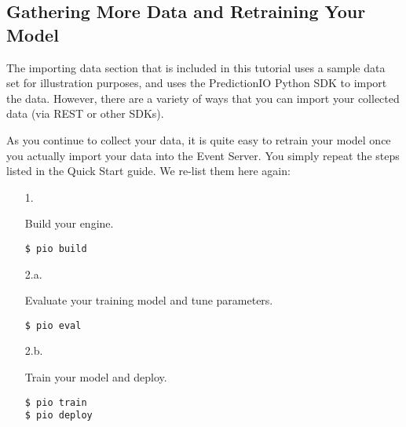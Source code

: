 \documentclass[a4paper,12pt]{article}
\newcommand{\3}{\left}
\newcommand{\4}{\right}
\renewcommand{\-}[1]{{}^{-#1}}
\begin{document}
\subsection*{Gathering More Data and Retraining Your Model}

The importing data section that is included in this tutorial uses a sample data set for illustration purposes, and uses the PredictionIO Python SDK to import the data. However, there are a variety of ways that you can import your collected data (via REST or other SDKs).

As you continue to collect your data, it is quite easy to retrain your model once you actually import your data into the Event Server. You simply repeat the steps listed in the Quick Start guide. We re-list them here again:

\begin{itemize}
\item[1.]{Build your engine.
\begin{verbatim}
$ pio build
\end{verbatim}}

\item[2.a.]{Evaluate your training model and tune parameters.
\begin{verbatim}
$ pio eval
\end{verbatim}}

\item[2.b.]{Train your model and deploy.
\begin{verbatim}
$ pio train
$ pio deploy
\end{verbatim}}
\end{itemize}


 
\end{document}
